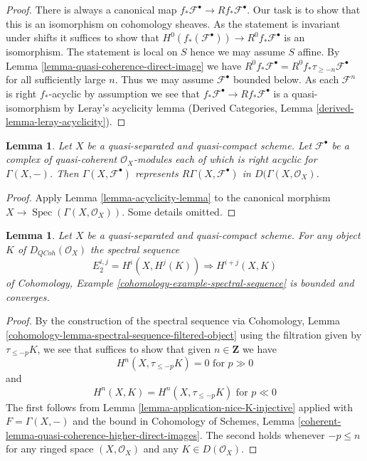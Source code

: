 \documentclass{stacks-project}
\theoremstyle{plain}
\newtheorem{lemma}[subsection]{Lemma}
\theoremstyle{definition}
\theoremstyle{remark}
\numberwithin{equation}{subsection}
\def\Spec{\mathop{\mathrm{Spec}}}
\def\QCoh{\mathit{QCoh}}
\begin{document}
\begin{proof}
There is always a canonical map
$f_*\mathcal{F}^\bullet \to Rf_*\mathcal{F}^\bullet$.
Our task is to show that this is an isomorphism on cohomology sheaves.
As the statement is invariant under shifts it suffices to show that
$H^0(f_*(\mathcal{F}^\bullet)) \to R^0f_*\mathcal{F}^\bullet$
is an isomorphism. The statement is local on $S$ hence we
may assume $S$ affine. By
Lemma \ref{lemma-quasi-coherence-direct-image}
we have $R^0f_*\mathcal{F}^\bullet = R^0f_*\tau_{\geq -n}\mathcal{F}^\bullet$
for all sufficiently large $n$. Thus we may assume $\mathcal{F}^\bullet$
bounded below. As each $\mathcal{F}^n$ is right $f_*$-acyclic by
assumption we see that $f_*\mathcal{F}^\bullet \to Rf_*\mathcal{F}^\bullet$
is a quasi-isomorphism by Leray's acyclicity lemma (Derived Categories, Lemma
\ref{derived-lemma-leray-acyclicity}).
\end{proof}

\begin{lemma}
\label{lemma-acyclicity-lemma-global}
Let $X$ be a quasi-separated and quasi-compact scheme.
Let $\mathcal{F}^\bullet$ be a complex of quasi-coherent
$\mathcal{O}_X$-modules each of which is right acyclic for $\Gamma(X, -)$.
Then $\Gamma(X, \mathcal{F}^\bullet)$ represents
$R\Gamma(X, \mathcal{F}^\bullet)$ in $D(\Gamma(X, \mathcal{O}_X)$.
\end{lemma}

\begin{proof}
Apply Lemma \ref{lemma-acyclicity-lemma} to the canonical morphism
$X \to \Spec(\Gamma(X, \mathcal{O}_X))$. Some details omitted.
\end{proof}

\begin{lemma}
\label{lemma-spectral-sequence}
Let $X$ be a quasi-separated and quasi-compact scheme. For any object
$K$ of $D_\QCoh(\mathcal{O}_X)$ the spectral sequence
$$
E_2^{i, j} = H^i(X, H^j(K)) \Rightarrow H^{i + j}(X, K)
$$
of Cohomology, Example \ref{cohomology-example-spectral-sequence}
is bounded and converges.
\end{lemma}

\begin{proof}
By the construction of the spectral sequence via
Cohomology, Lemma \ref{cohomology-lemma-spectral-sequence-filtered-object}
using the filtration given by $\tau_{\leq -p}K$, we see that
suffices to show that given $n \in \mathbf{Z}$ we have
$$
H^n(X, \tau_{\leq -p}K) = 0 \text{ for } p \gg 0
$$
and
$$
H^n(X, K) = H^n(X, \tau_{\leq -p}K) \text{ for } p \ll 0
$$
The first follows from Lemma \ref{lemma-application-nice-K-injective}
applied with $F = \Gamma(X, -)$ and the bound in
Cohomology of Schemes, Lemma
\ref{coherent-lemma-quasi-coherence-higher-direct-images}.
The second holds whenever
$-p \leq n$ for any ringed space $(X, \mathcal{O}_X)$ and any
$K \in D(\mathcal{O}_X)$.
\end{proof}
\end{document}
